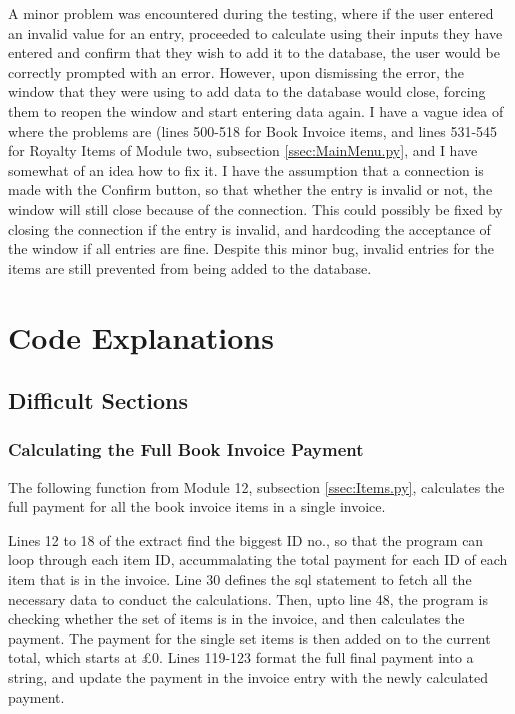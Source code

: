 A minor problem was encountered during the testing, where if the user entered an invalid value for an entry, proceeded to calculate using their inputs they have entered and confirm that they wish to add it to the database, the user would be correctly prompted with an error. However, upon dismissing the error, the window that they were using to add data to the database would close, forcing them to reopen the window and start entering data again. I have a vague idea of where the problems are (lines 500-518 for Book Invoice items, and lines 531-545 for Royalty Items of Module two, subsection \ref{ssec:MainMenu.py}, and I have somewhat of an idea how to fix it. I have the assumption that a connection is made with the Confirm button, so that whether the entry is invalid or not, the window will still close because of the connection. This could possibly be fixed by closing the connection if the entry is invalid, and hardcoding the acceptance of the window if all entries are fine. Despite this minor bug, invalid entries for the items are still prevented from being added to the database.

\section{Code Explanations}

\subsection{Difficult Sections}

\subsubsection{Calculating the Full Book Invoice Payment}
The following function from Module 12, subsection \ref{ssec:Items.py}, calculates the full payment for all the book invoice items in a single invoice.
\begin{tiny}
\end{tiny} 
Lines 12 to 18 of the extract find the biggest ID no., so that the program can loop through each item ID, accummalating the total payment for each ID of each item that is in the invoice. Line 30 defines the sql statement to fetch all the necessary data to conduct the calculations. Then, upto line 48, the program is checking whether the set of items is in the invoice, and then calculates the payment. The payment for the single set items is then added on to the current total, which starts at £0. Lines 119-123 format the full final payment into a string, and update the payment in the invoice entry with the newly calculated payment.


